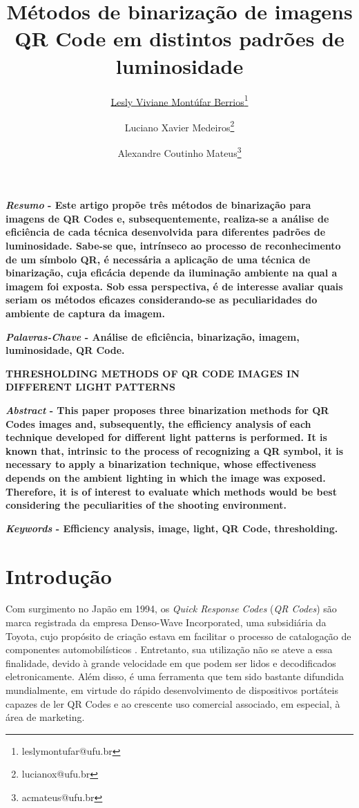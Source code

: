 \documentclass{ceel}
\title{Métodos de binarização de imagens QR Code em distintos padrões de luminosidade}
\author[1]{\underline{Lesly Viviane Montúfar Berrios}\thanks{leslymontufar@ufu.br}}
\author[2]{Luciano Xavier Medeiros\thanks{lucianox@ufu.br}}
\author[2]{Alexandre Coutinho Mateus\thanks{acmateus@ufu.br}}
\affil[1]{FEELT - Universidade Federal de Uberlândia}
\affil[2]{FEELT - Professor Adjunto - Universidade Federal de Uberlândia}
\begin{document}
\inserirtitulo

\begin{multicols}{2}

\textbf{\emph{Resumo} - Este artigo propõe três métodos de binarização para imagens de QR Codes e, subsequentemente, realiza-se a análise de eficiência de cada técnica desenvolvida para diferentes padrões de luminosidade. Sabe-se que, intrínseco ao processo de reconhecimento de um símbolo QR, é necessária a aplicação de uma técnica de binarização, cuja eficácia depende da iluminação ambiente na qual a imagem foi exposta. Sob essa perspectiva, é de interesse avaliar quais seriam os métodos eficazes considerando-se as peculiaridades do ambiente de captura da imagem.}
\vspace*{10pt}

\textbf{\emph{Palavras-Chave} - Análise de eficiência, binarização, imagem, luminosidade, QR Code.}


\begin{center}
\noindent\textbf{\large \uppercase{Thresholding methods of QR Code images in different light patterns}}
\end{center}

\textbf{\emph{Abstract} - This paper proposes three binarization methods for QR Codes images and, subsequently, the efficiency analysis of each technique developed for different light patterns is performed. It is known that, intrinsic to the process of recognizing a QR symbol, it is necessary to apply a binarization technique, whose effectiveness depends on the ambient lighting in which the image was exposed. Therefore, it is of interest to evaluate which methods would be best considering the peculiarities of the shooting environment.} 
\vspace*{10pt}

\textbf{\emph{Keywords} - Efficiency analysis, image, light, QR Code, thresholding.}

\section{Introdução}
Com surgimento no Japão em 1994, os \textit{Quick Response Codes} (\textit{QR Codes}) são marca registrada da empresa Denso-Wave Incorporated, uma subsidiária da Toyota, cujo propósito de criação estava em facilitar o processo de catalogação de componentes automobilísticos \cite{denso}. Entretanto, sua utilização não se ateve a essa finalidade, devido à grande velocidade em que podem ser lidos e decodificados eletronicamente. Além disso, é uma ferramenta que tem sido bastante difundida mundialmente, em virtude do rápido desenvolvimento de dispositivos portáteis capazes de ler QR Codes e ao crescente uso comercial associado, em especial, à área de marketing.


\end{multicols}
\end{document}
